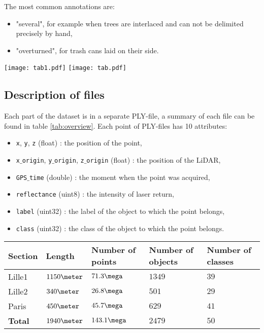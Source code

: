 \documentclass[a4paper, 10pt, journal]{article}
\begin{document}
The most common annotations are:
\begin{itemize}
 \item "several", for example when trees are interlaced and can not be delimited precisely by hand,
 \item "overturned", for trash cans laid on their side.
\end{itemize}

\begin{center}\centering
 \texttt{[image: tab1.pdf]}%
 \texttt{[image: tab.pdf]}
\end{center}

\subsection{Description of files} \label{subsec:summary}

Each part of the dataset is in a separate PLY-file, a summary of each file can be found in table \ref{tab:overview}. Each point of PLY-files has 10 attributes:
\begin{itemize}
 \item \texttt{x}, \texttt{y}, \texttt{z} (float) : the position of the point,
 \item \texttt{x$\_$origin}, \texttt{y$\_$origin}, \texttt{z$\_$origin} (float) : the position of the LiDAR,
 \item \texttt{GPS$\_$time} (double) : the moment when the point was acquired,
 \item \texttt{reflectance} (uint8) : the intensity of laser return,
 \item \texttt{label} (uint32) : the label of the object to which the point belongs,
 \item \texttt{class} (uint32) : the class of the object to which the point belongs.
\end{itemize}

\begin{center}\centering
 \begin{tabular}{C{1.0cm}C{1.0cm}C{1.4cm}C{1.5cm}C{1.4cm}}
  \toprule
   \textbf{Section} & \textbf{Length} & \textbf{Number of points} & \textbf{Number of objects} & \textbf{Number of classes} \\\midrule
   Lille1 & $1150\meter$ & $71.3\mega$ & $1349$ & $39$ \\
   Lille2 & $340\meter$ & $26.8\mega$ & $501$ & $29$ \\
   Paris & $450\meter$ & $45.7\mega$ & $629$ & $41$ \\\midrule
   \textbf{Total} & $1940\meter$ & $143.1\mega$ & $2479$ & $50$ \\
  \bottomrule 
 \end{tabular}
\end{center}
\end{document}
